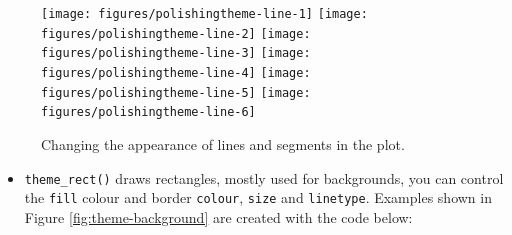 \begin{Shaded}
\begin{Highlighting}[]
\StringTok{ }\NormalTok{(} \NormalTok{(} \NormalTok{))}
\StringTok{ }\NormalTok{(} \NormalTok{(} \NormalTok{))}
\StringTok{ }\NormalTok{(} \NormalTok{(} \NormalTok{))}
\StringTok{ }\NormalTok{(} \NormalTok{())}
\StringTok{ }\NormalTok{(} \NormalTok{(} \NormalTok{))}
\StringTok{ }\NormalTok{(} \NormalTok{(} \NormalTok{, } \NormalTok{))}
\end{Highlighting}
\end{Shaded}

\begin{figure}

{\centering \texttt{[image: figures/polishingtheme-line-1]} \texttt{[image: figures/polishingtheme-line-2]} \texttt{[image: figures/polishingtheme-line-3]} \texttt{[image: figures/polishingtheme-line-4]} \texttt{[image: figures/polishingtheme-line-5]} \texttt{[image: figures/polishingtheme-line-6]} 

}

\caption{Changing the appearance of lines and segments in the plot.\label{fig:theme-line}}
\end{figure}

\begin{itemize}
\itemsep1pt\parskip0pt
\item
  \texttt{theme\_rect()} draws rectangles, mostly used for backgrounds,
  you can control the \texttt{fill} colour and border \texttt{colour},
  \texttt{size} and \texttt{linetype}. Examples shown in Figure
  \ref{fig:theme-background} are created with the code below:
    
\end{itemize}

